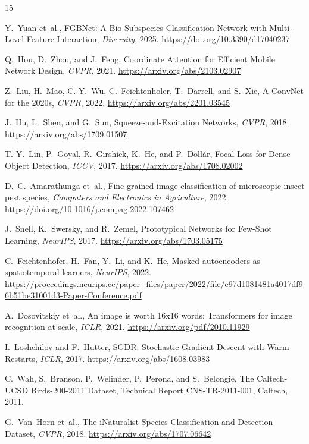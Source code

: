 \documentclass[11pt]{article}
\begin{document}
\begin{thebibliography}{15}

Y.~Yuan et~al., FGBNet: A Bio-Subspecies Classification Network with Multi-Level Feature Interaction, \emph{Diversity}, 2025. \url{https://doi.org/10.3390/d17040237}

Q.~Hou, D.~Zhou, and J.~Feng, Coordinate Attention for Efficient Mobile Network Design, \emph{CVPR}, 2021. \url{https://arxiv.org/abs/2103.02907}

Z.~Liu, H.~Mao, C.-Y.~Wu, C.~Feichtenholer, T.~Darrell, and S.~Xie, A ConvNet for the 2020s, \emph{CVPR}, 2022. \url{https://arxiv.org/abs/2201.03545}

J.~Hu, L.~Shen, and G.~Sun, Squeeze-and-Excitation Networks, \emph{CVPR}, 2018. \url{https://arxiv.org/abs/1709.01507}

T.-Y.~Lin, P.~Goyal, R.~Girshick, K.~He, and P.~Doll\'{a}r, Focal Loss for Dense Object Detection, \emph{ICCV}, 2017. \url{https://arxiv.org/abs/1708.02002}

D.~C.~Amarathunga et~al., Fine-grained image classification of microscopic insect pest species, \emph{Computers and Electronics in Agriculture}, 2022. \url{https://doi.org/10.1016/j.compag.2022.107462}

J.~Snell, K.~Swersky, and R.~Zemel, Prototypical Networks for Few-Shot Learning, \emph{NeurIPS}, 2017. \url{https://arxiv.org/abs/1703.05175}

C.~Feichtenhofer, H.~Fan, Y.~Li, and K.~He, Masked autoencoders as spatiotemporal learners, \emph{NeurIPS}, 2022. \url{https://proceedings.neurips.cc/paper_files/paper/2022/file/e97d1081481a4017df96b51be31001d3-Paper-Conference.pdf}

A.~Dosovitskiy et~al., An image is worth 16x16 words: Transformers for image recognition at scale, \emph{ICLR}, 2021. \url{https://arxiv.org/pdf/2010.11929}

I.~Loshchilov and F.~Hutter, SGDR: Stochastic Gradient Descent with Warm Restarts, \emph{ICLR}, 2017. \url{https://arxiv.org/abs/1608.03983}

C.~Wah, S.~Branson, P.~Welinder, P.~Perona, and S.~Belongie, The Caltech-UCSD Birds-200-2011 Dataset, Technical Report CNS-TR-2011-001, Caltech, 2011.

G.~Van~Horn et~al., The iNaturalist Species Classification and Detection Dataset, \emph{CVPR}, 2018. \url{https://arxiv.org/abs/1707.06642}

\end{thebibliography}
\end{document}
